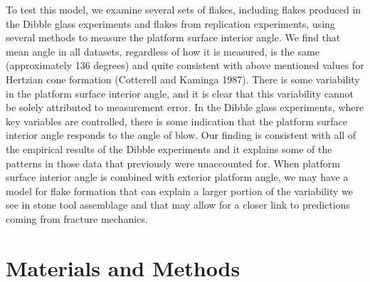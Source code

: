\documentclass[10pt,letterpaper]{article}
\begin{document}
To test this model, we examine several sets of flakes, including flakes
produced in the Dibble glass experiments and flakes from replication
experiments, using several methods to measure the platform surface
interior angle. We find that mean angle in all datasets, regardless of
how it is measured, is the same (approximately 136 degrees) and quite
consistent with above mentioned values for Hertzian cone formation
(Cotterell and Kaminga 1987). There is some variability in the platform
surface interior angle, and it is clear that this variability cannot be
solely attributed to measurement error. In the Dibble glass experiments,
where key variables are controlled, there is some indication that the
platform surface interior angle responds to the angle of blow. Our
finding is consistent with all of the empirical results of the Dibble
experiments and it explains some of the patterns in those data that
previously were unaccounted for. When platform surface interior angle is
combined with exterior platform angle, we may have a model for flake
formation that can explain a larger portion of the variability we see in
stone tool assemblage and that may allow for a closer link to
predictions coming from fracture mechanics.

\hypertarget{materials-and-methods}{%
\section{Materials and Methods}\label{materials-and-methods}}
\end{document}
